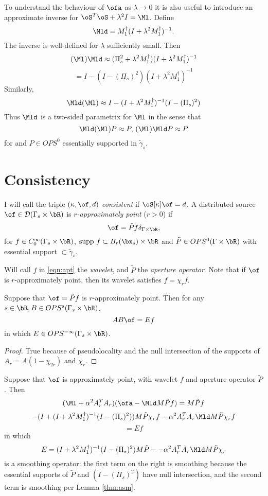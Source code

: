 To understand the behaviour of $\ofa$ as $\lambda \rightarrow 0$ it is also useful to introduce an approximate inverse for $\oS^T\oS + \lambda^2 I = \Ml$. Define
\[
\Mld = M_1^{\dagger} (I + \lambda^2 M_1^{\dagger})^{-1}.
\]
The inverse is well-defined for $\lambda$ sufficiently small. Then
\[
(\Ml ) \Mld \approx (\Pi_s^2 + \lambda^2 M_1^{\dagger}) (I + \lambda^2 M_1^{\dagger})^{-1}
\]
\[
=I - (I-(\Pi_s)^2) (I + \lambda^2 M_1^{\dagger})^{-1}
\]
Similarly,
\[
\Mld (\Ml) \approx I - (I + \lambda^2 M_1^{\dagger})^{-1} (I-(\Pi_s)^2) 
\]
Thus $\Mld$ is a two-sided parametrix for $\Ml$ in the sense that 
\[
\Mld (\Ml) P \approx P, \, (\Ml) \Mld P \approx P
\]
for and $P \in OPS^0$ essentially supported in $\tilde{\gamma}_s$.

\section{Consistency}

I will call the triple $(\kappa,\of,d)$ {\em consistent} if $\oS[\kappa]\of = d$. A distributed source $\of\in {\cal D}(\Gamma_s \times \bR)$ is {\em $r$-approximately point} ($r>0$) if 
\begin{equation}
\label{eqn:apt}
\of = \tilde{P} f \delta_{\Gamma \times \bR},
\end{equation}
for $f \in C^{\infty}_0(\Gamma_s \times \bR)$, $\mbox{supp }f \subset B_r(\bx_s) \times \bR$ and $\tilde{P} \in OPS^0(\Gamma \times \bR)$ with essential support $\subset \tilde{\gamma}_s$. 

Will call $f$ in \ref{eqn:apt} the {\em wavelet}, and $\tilde{P}$ the {\em aperture operator}. Note that if $\of$ is $r$-approximately point, then its wavelet satisfies $f=\chi_r f$. 

\begin{lemma}
\label{thm:asm}
Suppose that $\of = \tilde{P}f$ is $r$-approximately point. Then for any $s \in \bR, B \in OPS^s(\Gamma_s \times \bR)$, 
\[
A B \of = E f
\]
in which $E \in OPS^{-\infty}(\Gamma_s \times \bR)$.
\end{lemma}
\begin{proof}
True because of pseudolocality and the null intersection of the supports of $A_r=A(1-\chi_{2r})$ and $\chi_r$.
\end{proof}

Suppose that $\of$ is approximately point, with wavelet $f$ and aperture operator $\tilde{P}$. Then
\[
(\Ml + \alpha^2 A_r^TA_r)(\ofa - \Mld M\tilde{P}f) = M\tilde{P}f 
\]
\[
- (I + (I + \lambda^2 M_1^{\dagger})^{-1} (I-(\Pi_s)^2)) M\tilde{P}\chi_rf -\alpha^2 A_r^TA_r \Mld M\tilde{P}\chi_rf
\]
\begin{equation}
\label{eqn:old}
= E f
\end{equation}
in which 
\[
E = (I + \lambda^2 M_1^{\dagger})^{-1} (I-(\Pi_s)^2) M\tilde{P} - 
-\alpha^2 A_r^TA_r \Mld M\tilde{P}\chi_r
\]
is a smoothing operator: the first term on the right is smoothing because the essential supports of $\tilde{P}$ and $(I-(\Pi_s)^2)$ have null intersection, and the second term is smoothing per Lemma \ref{thm:asm}.

